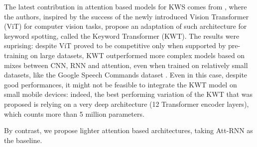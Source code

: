 The latest contribution in attention based models for KWS comes from \cite{kwtransformer2021berg}, where the authors, inspired by the success of the newly introduced Vision Transformer (ViT) \cite{vit2020Dosovitskiy} for computer vision tasks, propose an adaptation of such architecture for keyword spotting, called the Keyword Transformer (KWT). The results were suprising: despite ViT proved to be competitive only when supported by pre-training on large datasets, KWT outperformed more complex models based on mixes between CNN, RNN and attention, even when trained on relatively small datasets, like the Google Speech Commands dataset \cite{speechdataset2018warden}. Even in this case, despite good performances, it might not be feasible to integrate the KWT model on small mobile devices: indeed, the best performing variation of the KWT  that was proposed is relying on a very deep architecture (12 Transformer encoder layers), which counts more than 5 million parameters.

By contrast, we propose lighter attention based architectures, taking Att-RNN as the baseline.
